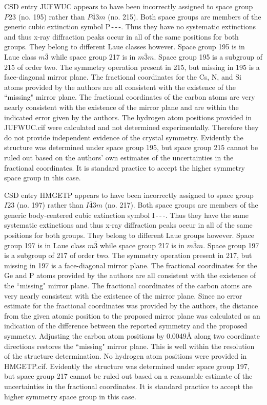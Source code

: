 \documentclass[preprint]{iucr}              %
\begin{document}
CSD entry JUFWUC \cite{Tesh92} appears to have been incorrectly assigned to
space group $P23$ (no. 195) rather than $P\bar{4}3m$ (no. 215).  Both space groups are members of the generic cubic extinction symbol P\,-\,-\,-.  Thus they have no systematic extinctions and thus x-ray diffraction peaks occur in all of the same positions for both groups.  They belong to different Laue classes however.  Space group 195 is in Laue class $m\bar{3}$ while space group 217 is in $m\bar{3}m$.  Space group 195 is a subgroup of 215 of order two.  The symmetry operation present in 215, but missing in 195 is a face-diagonal mirror plane.  The fractional coordinates for the Cs, N, and Si atoms provided by the authors are all consistent with the existence of the ``missing" mirror plane.  The fractional coordinates of the carbon atoms are very nearly consistent with the existence of the mirror plane and are within the indicated error given by the authors.  The hydrogen atom positions provided in JUFWUC.cif were calculated and not determined experimentally.  Therefore they do not provide independent evidence of the crystal symmetry.  Evidently the structure was determined under space group 195, but space group 215 cannot be ruled out based on the authors' own estimates of the uncertainties in the fractional coordinates.  It is standard practice to accept the higher symmetry space group in this case.

CSD entry HMGETP \cite{Dahl75} appears to have been incorrectly assigned to
space group $I23$ (no. 197) rather than $I\bar{4}3m$ (no. 217).  Both space
groups are members of the generic body-centered cubic extinction symbol
I\,-\,-\,-.  Thus they have the same systematic extinctions and thus x-ray
diffraction peaks occur in all of the same positions for both groups.  They
belong to different Laue groups however.  Space group 197 is in Laue class $m\bar{3}$ while space group 217 is in $m\bar{3}m$.    Space group 197 is a subgroup of 217 of order two.  The symmetry operation present in 217, but missing in 197 is a face-diagonal mirror plane.  The fractional coordinates for the Ge and P atoms provided by the authors are all consistent with the existence of the ``missing" mirror plane.  The fractional coordinates of the carbon atoms are very nearly consistent with the existence of the mirror plane.  Since no error estimate for the fractional coordinates was provided by the authors, the distance from the given atomic position to the proposed mirror plane was calculated as an indication of the difference between the reported symmetry and the proposed symmetry.  Adjusting the carbon atom positions by 0.0049\AA{} along two coordinate directions restores the ``missing" mirror plane.  This is well within the resolution of the structure determination.  No hydrogen atom positions were provided in HMGETP.cif.  Evidently the structure was determined under space group 197, but space group 217 cannot be ruled out based on a reasonable estimate of the uncertainties in the fractional coordinates.  It is standard practice to accept the higher symmetry space group in this case.
\end{document}
